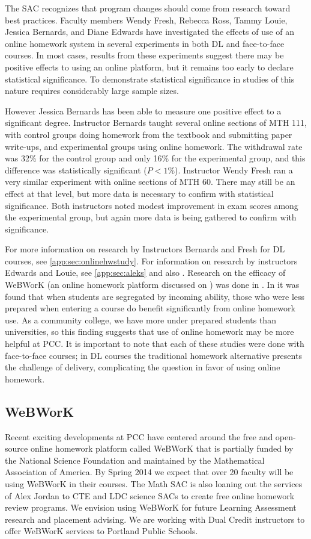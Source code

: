 The SAC recognizes that program changes should come from research toward best practices.
Faculty members Wendy Fresh, Rebecca Ross, Tammy Louie, Jessica Bernards, and Diane Edwards have investigated the effects of use of an online homework system in several experiments in both DL and face-to-face courses.
In most cases, results from these experiments suggest there may be positive effects to using an online platform, but it remains too early to declare statistical significance.
To demonstrate statistical significance in studies of this nature requires considerably large sample sizes.

However Jessica Bernards has been able to measure one positive effect to a significant degree.
Instructor Bernards taught several online sections of MTH 111, with control groups doing homework from the textbook and submitting paper write-ups, and experimental groups using online homework.
The withdrawal rate was 32\% for the control group and only 16\% for the experimental group, and this difference was statistically significant ($P<1\%$).
Instructor Wendy Fresh ran a very similar experiment with online sections of MTH 60.
There may still be an effect at that level, but more data is necessary to confirm with statistical significance.
Both instructors noted modest improvement in exam scores among the experimental group, but again more data is being gathered to confirm with significance.

For more information on research by Instructors Bernards and Fresh for DL courses, see \vref{app:sec:onlinehwstudy}.
For information on research by instructors Edwards and Louie, see \vref{app:sec:aleks} and also .
Research on the efficacy of WeBWorK (an online homework platform discussed on ) was done in \cite{focuswebwork}.
In \cite{brewer} it was found that when students are segregated by incoming ability, those who were less prepared when entering a course do benefit significantly from online homework use.
As a community college, we have more under prepared students than universities, so this finding suggests that use of online homework may be more helpful at PCC.
It is important to note that each of these studies were done with face-to-face courses; in DL courses the traditional homework alternative presents the challenge of delivery, complicating the question in favor of using online homework.

\subsection{WeBWorK}\label{other:sec:webwork}
Recent exciting developments at PCC have centered around the free and open-source online homework platform called WeBWorK that is partially funded by the National Science Foundation and maintained by the Mathematical Association of America.
By Spring 2014 we expect that over 20 faculty will be using WeBWorK in their courses.
The Math SAC is also loaning out the services of Alex Jordan to CTE and LDC science SACs to create free online homework review programs.
We envision using WeBWorK for future Learning Assessment research and placement advising.
We are working with Dual Credit instructors to offer WeBWorK services to Portland Public Schools.

